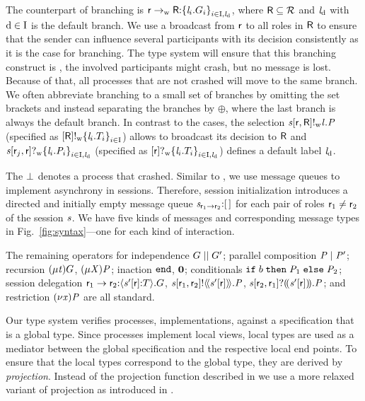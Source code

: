 The \weakR counterpart of branching is $ \GBranW{\Role}{\Role[R]}{\Set{\Label_i.\GT_i}_{i \in \indexSet, \LabelD}} $, where $ \Role[R] \subseteq \roles $ and $ \LabelD $ with $ \default \in \indexSet $ is the default branch.
We use a broadcast from $ \Role $ to all roles in $ \Role[R] $ to ensure that the sender can influence several participants with its decision consistently as it is the case for \strongR branching.
The type system will ensure that this branching construct is \weakR, \ie the involved participants might crash, but no message is lost.
Because of that, all processes that are not crashed will move to the same branch.
We often abbreviate branching \wrt to a small set of branches by omitting the set brackets and instead separating the branches by $ \oplus $, where the last branch is always the default branch.
In contrast to the \strongR cases, the \weakR selection $ \PSelW{\Chan}{\Role}{\Role[R]}{\Label}{\PT} $ (specified as $ \LSelW{\Role[R]}{\Set{ \Label_i.\LT_i }_{i \in \indexSet}} $) allows to broadcast its decision to $ \Role[R] $ and $ \PBranW{\Chan}{\Role_j}{\Role}{\Set{ \Label_i.\PT_i }_{i \in \indexSet, \LabelD}} $ (specified as $ \LBranW{\Role}{\Set{ \Label_i.\LT_i }_{i \in \indexSet, \LabelD}} $) defines a default label $ \LabelD $.

The $ \PCrash $ denotes a process that crashed.
Similar to \cite{hondaYoshidaCarbone16}, we use message queues to implement asynchrony in sessions.
Therefore, session initialization introduces a directed and initially empty message queue $ \MQ{\Chan[s]}{\Role_1}{\Role_2}{\emptyList} $ for each pair of roles $ \Role_1 \neq \Role_2 $ of the session $ \Chan[s] $.
We have five kinds of messages and corresponding message types in Fig.~\ref{fig:syntax}---one for each kind of interaction.

The remaining operators for independence $ \GPar{\GT}{\GT'} $; parallel composition $ \PPar{\PT}{\PT'} $; recursion $ \GRep{\TypeV}{\GT} $, $ \PRep{\ProcV}{\PT} $; inaction $ \GEnd $, $ \PEnd $; conditionals $ \PITE{\Expr[b]}{\PT_1}{\PT_2} $; session delegation $ \GDel{\Role_1}{\Role_2}{\Chan'}{\Role}{\LT}{\GT} $, $ \PDelA{\Chan}{\Role_1}{\Role_2}{\AT{\Chan'}{\Role}}{\PT} $, $ \PDelB{\Chan}{\Role_2}{\Role_1}{\AT{\Chan'}{\Role}}{\PT} $; and restriction $ \PRes{\Args}{\PT} $ are all standard.

Our type system verifies processes, \ie implementations, against a specification that is a global type.
Since processes implement local views, local types are used as a mediator between the global specification and the respective local end points.
To ensure that the local types correspond to the global type, they are derived by \emph{projection}.
Instead of the projection function described in \cite{hondaYoshidaCarbone16} we use a more relaxed variant of projection as introduced in \cite{YoshidaDanielouBejleriHu10}.


